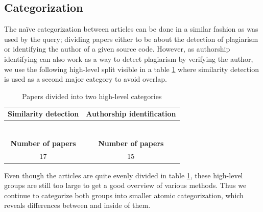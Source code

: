 \subsection{Categorization}

The naïve categorization between articles can be done in a similar fashion as was used by the query; dividing papers either to be about the detection of plagiarism or identifying the author of a given source code. However, as authorship identifying can also work as a way to detect plagiarism by verifying the author, we use the following high-level split visible in a table \ref{table-highcateq} where similarity detection is used as a second major category to avoid overlap.

\begin{table}[ht]
    \caption{Papers divided into two high-level categories}
    \label{table-highcateq}
    \centering
    \begin{tabular}{ | c | c | }
        
        \hline
        {\bf Similarity detection} & {\bf Authorship identification} \\ \hline
    
        \cite{AFAPLI2015, LICD2010, AASCPD2012} & \cite{SCAANN2017, ABEC2014, CAPSCAP2014}   \\
        \cite{Heblikar2015NormalizationBS, USCR2014, AIR2015} &  \cite{SCANG2007, EJPFSAI2004, ACSBPD2012}\\
        \cite{OTIOLSS2015, BUAA2009, ramirez2015high} &  \cite{APASCAI2007, UCMHGAAI2007, ESHPFSCAC2008}\\
        \cite{Ohmann2015, TBCFPD2012, Fu2017WASTKAW} &  \cite{AIRTSCAA2009, TSUDIJSCAI2011, DNNSCAI2013} \\
        \cite{ASTMLPD2013, AAPSCDPTK2013, CPDPPD2013}    & \cite{SCAIUFL2013, SDNAIJSP2015, AISC2017} \\
        \cite{PACASCD2005, RCISCP2017} &  \\ \hline
        {\bf Number of papers} & {\bf Number of papers} \\ \hline
        17 & 15 \\ \hline
    \end{tabular}
\end{table}

\noindent
Even though the articles are quite evenly divided in table \ref{table-highcateq}, these high-level groups are still too large to get a good overview of various methods. Thus we continue to categorize both groups into smaller atomic categorization, which reveals differences between and inside of them.  

